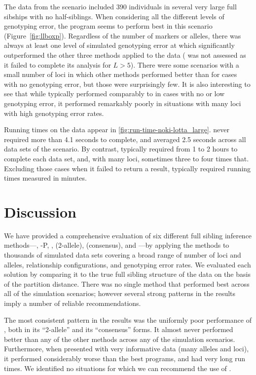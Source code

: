 %
The data from the \lottalarge{} scenario included 390 individuals in several very large full sibships 
with no half-siblings.  When considering all the different levels of genotyping error, the program 
\familyfinder{} seems to perform best in this scenario (Figure~\ref{fig:llboxp}). Regardless of the 
number of markers or alleles, there was always at least one level of simulated genotyping error at 
which \familyfinder{} significantly outperformed the other three methods applied to the \lottalarge{} 
data (\kinalyzer{} was not assessed as it failed to complete its analysis for $L>5$). There were some 
scenarios with a small number of loci in which other methods performed better than \familyfinder{} for 
cases with no genotyping error, but those were surprisingly few.  It is also interesting to see that 
while \colony{} typically performed comparably to \familyfinder{} in cases with no or low genotyping 
error, it performed remarkably poorly in situations with many loci with high genotyping error rates.  

Running times on the \lottalarge{} data appear in \ref{fig:run-time-noki-lotta_large}.  \familyfinder{} 
never required more than 4.1 seconds to complete, and averaged 2.5 seconds across all data sets of the 
\lottalarge{} scenario.  By contrast, \colony{} typically required from 1 to 2 hours to complete each 
data set, and, with many loci, sometimes three to four times that. Excluding those cases when it failed 
to return a result, \prt{} typically required running times measured in minutes.

\section*{Discussion}
We have provided a comprehensive evaluation of six different full sibling inference
methods---\colony{}, \colony-P, \familyfinder{}, \kinalyzer{} (2-allele), \kinalyzer{} (consensus), 
and \prt{}---by applying the methods to thousands of simulated data sets covering a broad range of number of loci 
and alleles, relationship configurations, and genotyping error rates.  We evaluated each solution by 
comparing it to the true full sibling structure of the data on the basis of the partition distance.  
There was no single method that performed best across all of the simulation scenarios; however several 
strong patterns in the results imply a number of reliable recommendations.

The most consistent pattern in the results was the uniformly poor performance of \kinalyzer{}, both in 
its ``2-allele'' and its ``consensus'' forms.  It almost never performed better than any of the other 
methods across any of the simulation scenarios.  Furthermore, when presented with very informative data 
(many alleles and loci), it performed considerably worse than the best programs, and had very long run 
times.  We identified no situations for which we can recommend the use of \kinalyzer{}.

